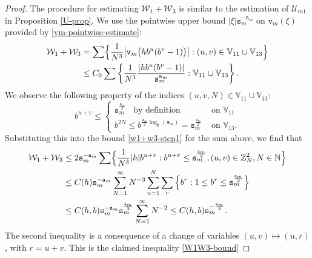 \documentclass[12pt, twoside]{article}
\theoremstyle{definition}
\numberwithin{equation}{section}
\begin{document}
\begin{proof} 
The procedure for estimating $\mathcal W_1 + \mathcal W_3$ is similar to the estimation of $\mathscr{U}_{m1}$ in Proposition \ref{U-prop}. We use the pointwise upper bound $|\xi| \mathtt s_m^{-\mathtt a_m}$ on $\mathtt v_m(\xi)$ provided by \eqref{vm-pointwise-estimate}:
\begin{align} 
\mathcal W_1 + \mathcal W_3 &= \sum \Bigl\{ \frac{1}{N^{3}} \bigl| \mathtt v_m \bigl(hb^u(b^v-1) \bigr) \bigr| : (u, v) \in \mathbb V_{11} \cup \mathbb V_{13} \Bigr\} \nonumber \\  &\leq C_0 \sum \left\{\frac{1}{N^{3}} \frac{|h b^u(b^v-1)|}{\mathtt s_m^{\mathtt a_m}} : \mathbb V_{11} \cup \mathbb V_{13} \right\}. \label{w1+w3-step1}
\end{align} 
We observe the following property of the indices $(u, v, N) \in \mathbb V_{11} \cup \mathbb V_{13}$:
\[b^{u+v} \leq \begin{cases} \mathtt s_m^{\frac{\mathtt a_m}{2}} \; \; \text{ by definition }  &\text{ on } \mathbb V_{11} \\ b^{2N} \leq b^{\frac{\mathtt a_m}{2}  \log_{\mathtt b} (\mathtt s_m) } = \mathtt s_m^{\frac{\mathtt a_m}{2}} &\text{ on } \mathbb V_{13}. \end{cases} \] 
Substituting this into the bound \eqref{w1+w3-step1} for the sum above, we find that
\begin{align*} 
\mathcal W_1 + \mathcal W_3 &\leq 2 \mathtt s_m^{-\mathtt a_m} \sum \Bigl\{\frac{1}{N^3}|h| b^{u+v} : b^{u+v} \leq \mathtt s_m^{\frac{\mathtt a_m}{2}}, (u, v) \in \mathbb Z_N^2, N \in \mathbb N \Bigr\} \\ &\leq C(h)  \mathtt s_m^{-\mathtt a_m} \sum_{N=1}^{\infty} N^{-3} \sum_{u=1}^{N} \sum_r \left\{b^r : 1 \leq b^r \leq \mathtt s_m^{\frac{\mathtt a_m}{2}} \right\} \\ &\leq C(h, b) \mathtt s_m^{-\mathtt a_m} \mathtt s_m^{\frac{\mathtt a_m}{2}} \sum_{N=1}^{\infty} N^{-2} \leq C(h, b)  \mathtt s_m^{-\frac{\mathtt a_m}{2}}. 
\end{align*} 
The second inequality is a consequence of a change of variables $(u, v) \mapsto (u, r)$, with $r = u+v$. This is the claimed inequality \eqref{W1W3-bound}
\end{proof} 
\end{document}
